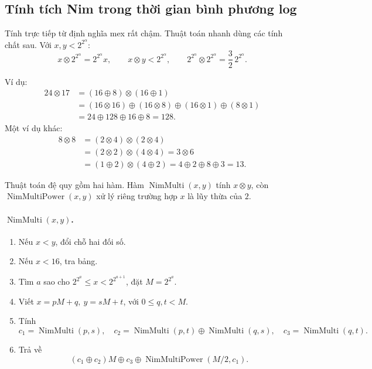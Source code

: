 \documentclass[11pt]{article}
\newcommand{\xor}{\oplus}
\newcommand{\nimprod}{\otimes}
\begin{document}
\subsection{Tính tích Nim trong thời gian bình phương log}

Tính trực tiếp từ định nghĩa mex rất chậm. Thuật toán nhanh dùng các tính chất
sau. Với \(x,y<2^{2^\alpha}\):
\[
  x\nimprod 2^{2^\alpha}=2^{2^\alpha}x,\qquad
  x\nimprod y<2^{2^\alpha},\qquad
  2^{2^\alpha}\nimprod 2^{2^\alpha}=\frac32\,2^{2^\alpha}.
\]

Ví dụ:
\[
\begin{aligned}
24\nimprod17
&=(16\xor8)\nimprod(16\xor1)\\
&=(16\nimprod16)\xor(16\nimprod8)\xor(16\nimprod1)\xor(8\nimprod1)\\
&=24\xor128\xor16\xor8=128.
\end{aligned}
\]
Một ví dụ khác:
\[
\begin{aligned}
8\nimprod8
&=(2\nimprod4)\nimprod(2\nimprod4)\\
&=(2\nimprod2)\nimprod(4\nimprod4)
=3\nimprod6\\
&=(1\xor2)\nimprod(4\xor2)
=4\xor2\xor8\xor3=13.
\end{aligned}
\]

Thuật toán đệ quy gồm hai hàm. Hàm
\(\operatorname{NimMulti}(x,y)\) tính \(x\nimprod y\), còn
\(\operatorname{NimMultiPower}(x,y)\) xử lý riêng trường hợp \(x\) là lũy thừa
của \(2\).

\paragraph{\(\operatorname{NimMulti}(x,y)\).}
\begin{enumerate}
  \item Nếu \(x<y\), đổi chỗ hai đối số.
  \item Nếu \(x<16\), tra bảng.
  \item Tìm \(a\) sao cho
  \(2^{2^a}\le x<2^{2^{a+1}}\), đặt \(M=2^{2^a}\).
  \item Viết \(x=pM+q,\ y=sM+t\), với \(0\le q,t<M\).
  \item Tính
  \[
    c_1=\operatorname{NimMulti}(p,s),\quad
    c_2=\operatorname{NimMulti}(p,t)\xor\operatorname{NimMulti}(q,s),\quad
    c_3=\operatorname{NimMulti}(q,t).
  \]
  \item Trả về
  \[
    (c_1\xor c_2)M\xor c_3
    \xor \operatorname{NimMultiPower}(M/2,c_1).
  \]
\end{enumerate}
\end{document}
